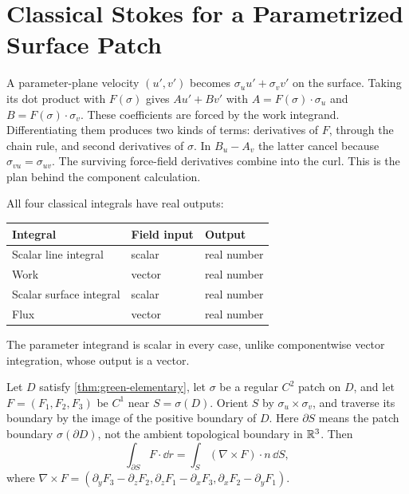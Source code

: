 \section{Classical Stokes for a Parametrized Surface Patch}

A parameter-plane velocity $(u',v')$ becomes
$\sigma_u u'+\sigma_v v'$ on the surface. Taking its dot product with
$F(\sigma)$ gives $A u'+B v'$ with
$A=F(\sigma)\cdot\sigma_u$ and $B=F(\sigma)\cdot\sigma_v$.
These coefficients are forced by the work integrand. Differentiating them
produces two kinds of terms: derivatives of $F$, through the chain rule,
and second derivatives of $\sigma$. In $B_u-A_v$ the latter cancel
because $\sigma_{vu}=\sigma_{uv}$. The surviving force-field derivatives
combine into the curl. This is the plan behind the component calculation.

All four classical integrals have real outputs:
\begin{center}
\begin{tabular}{lll}
Integral & Field input & Output\\\hline
Scalar line integral & scalar & real number\\
Work & vector & real number\\
Scalar surface integral & scalar & real number\\
Flux & vector & real number
\end{tabular}
\end{center}
The parameter integrand is scalar in every case, unlike componentwise
vector integration, whose output is a vector.

\begin{theorem}
\label{thm:classical-patch-stokes}
Let $D$ satisfy \cref{thm:green-elementary}, let $\sigma$ be a regular $C^2$
patch on $D$, and let $F=(F_1,F_2,F_3)$ be $C^1$ near $S=\sigma(D)$.
Orient $S$ by $\sigma_u\times\sigma_v$, and traverse its boundary by the image
of the positive boundary of $D$. Here $\partial S$ means the patch
boundary $\sigma(\partial D)$, not the ambient topological boundary in $\mathbb{R}^3$. Then
\[
\int_{\partial S}F\cdot\dd r=\int_S(\nabla\times F)\cdot n\,\dd S,
\]
where $\nabla\times F=(\partial_yF_3-\partial_zF_2,
\partial_zF_1-\partial_xF_3,\partial_xF_2-\partial_yF_1)$.
\end{theorem}

